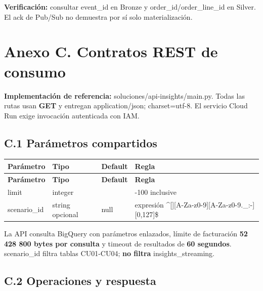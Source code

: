 \documentclass[11pt]{article}
\begin{document}
\textbf{Verificación:} consultar event\_\allowbreak{}id en Bronze y order\_\allowbreak{}id/order\_\allowbreak{}line\_\allowbreak{}id en Silver. El ack de Pub/Sub no demuestra por sí solo materialización.\par




\clearpage
\section*{Anexo C. Contratos REST de consumo}

\textbf{Implementación de referencia:} soluciones/\allowbreak{}api-insights/\allowbreak{}main.py. Todas las rutas usan \textbf{GET} y entregan application/\allowbreak{}json; charset=utf-8. El servicio Cloud Run exige invocación autenticada con IAM.\par

\subsection{C.1 Parámetros compartidos}

\begingroup\small
\begin{longtable}{@{}>{\raggedright\arraybackslash}p{}>{\raggedright\arraybackslash}p{}>{\raggedright\arraybackslash}p{}>{\raggedright\arraybackslash}p{}@{}}
\toprule
\textbf{Parámetro} & \textbf{Tipo} & \textbf{Default} & \textbf{Regla} \\
\midrule
\endfirsthead
\toprule
\textbf{Parámetro} & \textbf{Tipo} & \textbf{Default} & \textbf{Regla} \\
\midrule
\endhead
limit & integer & 25 & 1-100 inclusive \\
scenario\_\allowbreak{}id & string opcional & null & expresión \textasciicircum[][A-Za-z0-9][A-Za-z0-9.\_\allowbreak{}:-][0,127]\$ \\
\bottomrule
\end{longtable}
\endgroup

La API consulta BigQuery con parámetros enlazados, límite de facturación \textbf{52 428 800 bytes por consulta} y timeout de resultados de \textbf{60 segundos}. scenario\_\allowbreak{}id filtra tablas CU01-CU04; \textbf{no filtra} insights\_\allowbreak{}streaming.\par

\subsection{C.2 Operaciones y respuesta}
\end{document}
